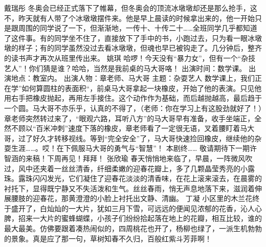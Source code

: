 {}\markdownRendererInterblockSeparator
{}戴瑞彤\markdownRendererInterblockSeparator
{}冬奥会已经正式落下了帷幕，但冬奥会的顶流冰墩墩却还是那么抢手，这不，昨天就有人带了个冰墩墩摆件来。他是早上晨读的时候拿出来的，他一开始只是跟周围的同学说了一下，但渐渐地，一传十、十传二十……全班同学几乎都知道了这件事。有的同学坐不住了，直接放下了手中的书，小跑过去，只为看一眼冰墩墩的样子；有的同学虽然没过去看冰墩墩，但魂也早已被钩走了。几分钟后，整齐的读书声才再次从班里传出来。\markdownRendererInterblockSeparator
{}\markdownRendererInterblockSeparator
{}姚琪\markdownRendererInterblockSeparator
{}哈啰！今天没有“暴力女”，但有一个“杂技艺人”！你们猜是谁？哈哈，当然是我前桌的马大哥咯！\markdownRendererInterblockSeparator
{}出演时间：数学课。 出演地点：教室内。\markdownRendererInterblockSeparator
{}出演人物：章老师、马大哥 主题：杂耍艺人\markdownRendererInterblockSeparator
{}数学课上，我们正在学”如何算圆柱的表面积“，前桌马大哥拿起一块橡皮，开始了他的表演。只见他用右手把橡皮抛起，再用左手接住。这个动作作为基础，而后越抛越高，最后趋于一个圆。马大哥不亦乐乎，认真的不得了，（老师：你在学习上有这股劲就好了！）章老师突然转过来了，“眼观六路，耳听八方”的马大哥早有准备，收手坐端正，全然不顾以“百米冲刺”速度下落的橡皮，章老师看了一定很无语，叉着腰盯着马大哥，过了好久才转移视线。等到“完全安全”了，马大哥快速捡回橡皮，继续他的杂耍生涯……。哎！在下佩服马大哥的勇气与“智慧”！ 本剧终……\markdownRendererInterblockSeparator
{}敬请期待下一期许智涵的来稿！下周再见！拜拜！\markdownRendererInterblockSeparator
{}\markdownRendererInterblockSeparator
{}张欣瑜\markdownRendererInterblockSeparator
{}春天悄悄地来临了，早晨，一阵微风吹过，风中还夹着一丝丝清香，纤细柔嫩的迎春花瓣上，多了几颗晶莹秀亮的小露珠。露珠闪闪发光，它们凝住了迎春花淡淡的清香味，在花上滚来滚去，在晨雾的衬托下，显得既宁静又不失活泼和生气。丝丝春雨，悄无声息地落下来，滋润着伸展腰肢的迎春花，那黄澄澄的小脸上衬托出文静、清幽。\markdownRendererInterblockSeparator
{}\markdownRendererInterblockSeparator
{}丁凝\markdownRendererInterblockSeparator
{}小区里的木兰花终于盛开了，白灿灿的一大片，犹如三月下雪，可远远的便闻见浓郁的花香，沁人心脾，招来一大片的蜜蜂蝴蝶，小孩子们纷纷拾起落在地上的花瓣，相互比较，谁的最大最美。仿佛要跟着凑热闹似的，四周桃花也开了，杨柳也绿了，一派生机勃勃的景象。真是应了那一句，草树知春不久归，百般红紫斗芳菲啊！\markdownRendererInterblockSeparator
{}\markdownRendererInterblockSeparator
